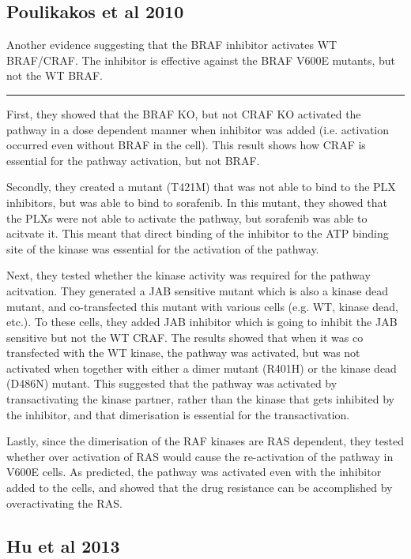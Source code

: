 \documentclass[a4paper,12pt]{article}
\begin{document}
\subsection*{\normalsize{Poulikakos et al 2010}}

Another evidence suggesting that the BRAF inhibitor activates WT BRAF/CRAF.
The inhibitor is effective against the BRAF V600E mutants, but not the WT BRAF.

\noindent\rule{\textwidth}{0.4pt}

First, they showed that the BRAF KO, but not CRAF KO activated the pathway in a dose dependent manner when inhibitor was added (i.e. activation occurred even without BRAF in the cell).
This result shows how CRAF is essential for the pathway activation, but not BRAF.

Secondly, they created a mutant (T421M) that was not able to bind to the PLX inhibitors, but was able to bind to sorafenib.
In this mutant, they showed that the PLXs were not able to activate the pathway, but sorafenib was able to acitvate it.
This meant that direct binding of the inhibitor to the ATP binding site of the kinase was essential for the activation of the pathway.

Next, they tested whether the kinase activity was required for the pathway acitvation.
They generated a JAB sensitive mutant which is also a kinase dead mutant, and co-transfected this mutant with various cells (e.g. WT, kinase dead, etc.).
To these cells, they added JAB inhibitor which is going to inhibit the JAB sensitive but not the WT CRAF.
The results showed that when it was co transfected with the WT kinase, the pathway was activated, but was not activated when together with either a dimer mutant (R401H) or the kinase dead (D486N) mutant.
This suggested that the pathway was activated by transactivating the kinase partner, rather than the kinase that gets inhibited by the inhibitor, and that dimerisation is essential for the transactivation.

Lastly, since the dimerisation of the RAF kinases are RAS dependent, they tested whether over activation of RAS would cause the re-activation of the pathway in V600E cells.
As predicted, the pathway was activated even with the inhibitor added to the cells, and showed that the drug resistance can be accomplished by overactivating the RAS.

\subsection*{\normalsize{Hu et al 2013}}
\end{document}

